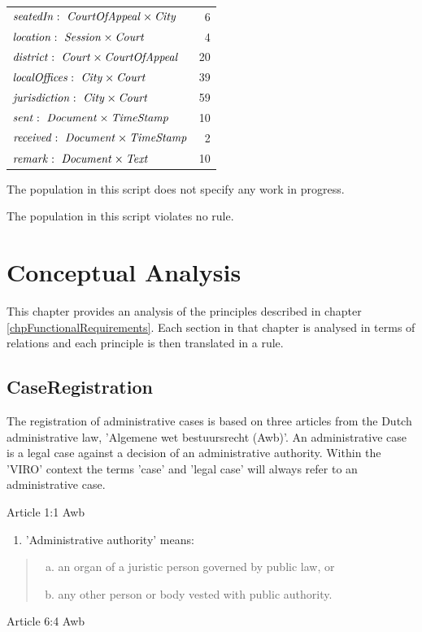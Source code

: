 \documentclass[10pt,a4paper]{report}              %
\theoremstyle{plain}\theorembodyfont{\rmfamily}\newtheorem{definition}{Definition}[section]
\theoremstyle{plain}\theorembodyfont{\rmfamily}\newtheorem{designrule}[definition]{Requirement}
\def\id#1{\mbox{\em #1\/}}
\newcommand{\rel}{\times}
\newcommand{\declare}[3]{\id{#1}:\ \id{#2}\rel\id{#3}}
\begin{document}
\begin{center}
\begin{tabular}{lr}
$\declare{seatedIn}{CourtOfAppeal}{City}$ & 6\\
$\declare{location}{Session}{Court}$ & 4\\
$\declare{district}{Court}{CourtOfAppeal}$ & 20\\
$\declare{localOffices}{City}{Court}$ & 39\\
$\declare{jurisdiction}{City}{Court}$ & 59\\
$\declare{sent}{Document}{TimeStamp}$ & 10\\
$\declare{received}{Document}{TimeStamp}$ & 2\\
$\declare{remark}{Document}{Text}$ & 10\\
\end{tabular}
\end{center}

The population in this script does not specify any work in progress. 

The population in this script violates no rule. 

\chapter{Conceptual Analysis}\label{chpConceptualAnalysis}

This chapter provides an analysis of the principles described in chapter \ref{chpFunctionalRequirements}. Each section in that chapter is analysed in terms of relations and each principle is then translated in a rule. 

\section{CaseRegistration}

The registration of administrative cases is based on three articles from
the Dutch administrative law, 'Algemene wet bestuursrecht (Awb)'. An
administrative case is a legal case against a decision of an
administrative authority. Within the 'VIRO' context the terms 'case' and
'legal case' will always refer to an administrative case.

Article 1:1 Awb

\begin{enumerate}[1.]
\item
  'Administrative authority' means:
\end{enumerate}
\begin{quote}
\begin{enumerate}[a.]
\item
  an organ of a juristic person governed by public law, or
\item
  any other person or body vested with public authority.
\end{enumerate}
\end{quote}
Article 6:4 Awb
\end{document}
